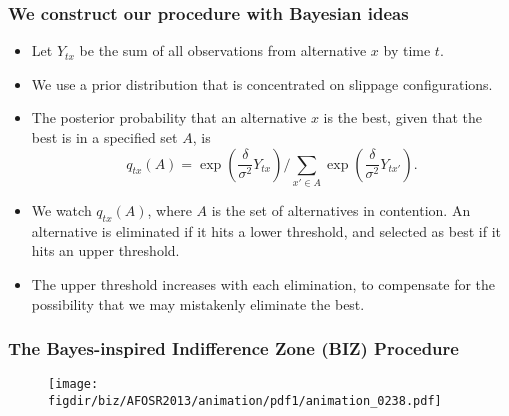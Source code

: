 \documentclass[13pt]{beamer}
\newcommand{\figdir}{../../fig}
\begin{document}
\begin{frame}
  \frametitle{We construct our procedure with Bayesian ideas}
  \begin{itemize}
  \item Let $Y_{tx}$ be the sum of all observations from alternative $x$ by time $t$.
  \item We use a prior distribution that is concentrated on slippage configurations.
  \item The posterior probability that an alternative $x$ is the best, given that the best is in a specified set $A$, is 
    \begin{equation*}
      q_{tx}(A) = \exp\left(\frac{\delta}{\sigma^2} Y_{tx}\right) \bigg/ \sum_{x'\in A} \exp\left(\frac{\delta}{\sigma^2} Y_{tx'}\right).
    \end{equation*}
  \item We watch $q_{tx}(A)$, where $A$ is the set of alternatives in contention.  An alternative is eliminated if it hits a lower threshold, and selected as best if it hits an upper threshold.
  \item The upper threshold increases with each elimination, to compensate for the possibility that we may mistakenly eliminate the best.
  \end{itemize}
\end{frame}

\begin{frame}
  \frametitle{The Bayes-inspired Indifference Zone (BIZ) Procedure}
  \begin{figure}
    \center
  \texttt{[image: \\figdir/biz/AFOSR2013/animation/pdf1/animation\_0238.pdf]}
  \end{figure}
\end{frame}
\end{document}
